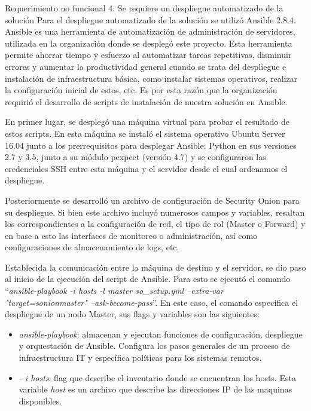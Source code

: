    \pagebreak
    \begin{section}{Requerimiento no funcional 4: Se requiere un despliegue automatizado de la solución}
    Para el despliegue automatizado de la solución se utilizó Ansible  2.8.4. Ansible es una herramienta de automatización de administración de servidores, utilizada en la organización donde se desplegó este proyecto. Esta herramienta permite ahorrar tiempo y esfuerzo al automatizar tareas repetitivas, disminuir errores y aumentar la productividad general cuando se trata del despliegue e instalación de infraestructura básica, como instalar sistemas operativos, realizar la configuración inicial de estos, etc. Es por esta razón que la organización requirió el desarrollo de scripts de instalación de nuestra solución en Ansible.\par
    En primer lugar, se desplegó una máquina virtual para probar el resultado de estos scripts. En esta máquina se instaló el sistema operativo Ubuntu Server 16.04 junto a los prerrequisitos para desplegar Ansible: Python en sus versiones 2.7 y 3.5, junto a su módulo pexpect (versión 4.7) y se configuraron las credenciales SSH entre esta máquina y el servidor desde el cual ordenamos el despliegue.\par
    Posteriormente se desarrolló un archivo de configuración de Security Onion para su despliegue. Si bien este archivo incluyó numerosos campos y variables, resaltan los correspondientes a la configuración de red, el tipo de rol (Master o Forward) y en base a esto las interfaces de monitoreo o administración, así como configuraciones de almacenamiento de logs, etc.\par
    Establecida la comunicación entre la máquina de destino y el servidor, se dio paso al inicio de la ejecución del script de Ansible. Para esto se ejecutó el comando “\textit{ansible-playbook -i hosts -l master so\_setup.yml --extra-var "target=sonionmaster"\hspace{1 mm} --ask-become-pass}”. En este caso, el comando especifica el despliegue de un nodo Master, sus flags y variables son las siguientes:
    \begin{itemize}
        \item \textit{ansible-playbook}: almacenan y ejecutan funciones de configuración, despliegue y orquestación de Ansible. Configura los pasos generales de un proceso de infraestructura IT y específica políticas para los sistemas remotos. 
        \item \textit{- i hosts}: flag que describe el inventario donde se encuentran los hosts. Esta variable \textit{host} es un archivo que describe las direcciones IP de las maquinas disponibles.

\end{itemize}
\end{section}
